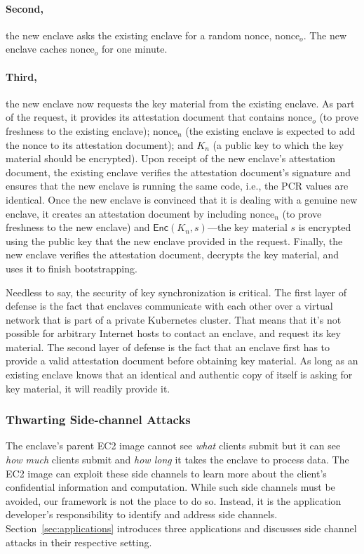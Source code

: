 \paragraph{Second,} the new enclave asks the existing enclave for a random
nonce, $\textrm{nonce}_o$.  The new enclave caches $\textrm{nonce}_o$ for one
minute.

\paragraph{Third,} the new enclave now requests the key material from the
existing enclave.  As part of the request, it provides its attestation document
that contains $\textrm{nonce}_o$ (to prove freshness to the existing enclave);
$\textrm{nonce}_n$ (the existing enclave is expected to add the nonce to its
attestation document); and $K_n$ (a public key to which the key material should
be encrypted).  Upon receipt of the new enclave's attestation document, the
existing enclave verifies the attestation document's signature and ensures that
the new enclave is running the same code, i.e., the PCR values are identical.
Once the new enclave is convinced that it is dealing with a genuine new
enclave, it creates an attestation document by including $\textrm{nonce}_n$ (to
prove freshness to the new enclave) and $\textsf{Enc}(K_n, s)$---the key
material $s$ is encrypted using the public key that the new enclave provided in
the request.  Finally, the new enclave verifies the attestation document,
decrypts the key material, and uses it to finish bootstrapping.

Needless to say, the security of key synchronization is critical.  The first
layer of defense is the fact that enclaves communicate with each other over a
virtual network that is part of a private Kubernetes cluster.  That means that
it's not possible for arbitrary Internet hosts to contact an enclave, and
request its key material.  The second layer of defense is the fact that an
enclave first has to provide a valid attestation document before obtaining key
material.  As long as an existing enclave knows that an identical and authentic
copy of itself is asking for key material, it will readily provide it.

\subsubsection{Thwarting Side-channel Attacks}
\label{sec:side-channels}

The enclave's parent EC2 image cannot see \emph{what} clients submit but it can
see \emph{how much} clients submit and \emph{how long} it takes the enclave to
process data.  The EC2 image can exploit these side channels to learn more
about the client's confidential information and computation.  While such side
channels must be avoided, our framework is not the place to do so.  Instead, it
is the application developer's responsibility to identify and address side
channels.  Section~\ref{sec:applications} introduces three applications and
discusses side channel attacks in their respective setting.

